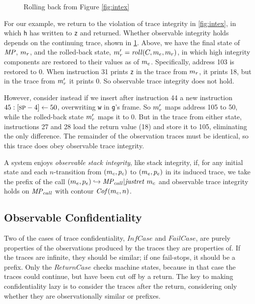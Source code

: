 \documentclass[acmsmall,review,anonymous]{acmart}\settopmatter{printfolios=true,printccs=false,printacmref=false}
\begin{document}
    \begin{figure}
      \integritylazyexample
      \caption{Rolling back from Figure \ref{fig:intex}}
      \label{fig:intlex}
    \end{figure}

    For our example, we return to the violation of trace integrity in
    \cref{fig:intex}, in which {\tt h} has written to {\tt z} and returned.
    Whether observable integrity holds depends on the continuing trace, shown
    in \cref{fig:intlex}. Above, we have the final state of \(\mathit{MP}\),
    \(m_r\), and the rolled-back state, \(m_r' =
    \mathit{roll}(C,m_e,m_r)\), in which high integrity
    components are restored to their values as of \(m_e\). Specifically,
    address 103 is restored to 0. When instruction 31 prints {\tt z} in the
    trace from \(m_r\), it prints 18, but in the trace from \(m_r'\)
    it prints 0. So observable trace integrity does not hold.

    However, consider instead if we insert after instruction 44 a new
    instruction \(45: [\textsc{sp}-4] \leftarrow 50\), overwriting {\tt w} in
    {\tt g}'s frame. So \(m_r'\) maps address 105 to 50, while the
    rolled-back state \(m_r'\) maps it to 0. But in the trace from either
    state, instructions 27 and 28 load the return value (18) and store it to
    105, eliminating the only difference. The remainder of the observation
    traces must be identical, so this trace does obey observable trace
    integrity.


      A system enjoys {\em observable stack integrity}, like stack integrity,
      if, for any initial state and each \(n\)-transition from
      \((m_c,p_c)\) to \((m_e,p_e)\) in its
      induced trace, we take the prefix of the call
      \((m_e,p_e) \hookrightarrow \mathit{MP}_{call} | \mathit{justret}\ m_c\)
      and observable trace integrity holds on \(\mathit{MP}_{call}\) with
      contour \(\mathit{Cof}(m_c,n)\).

  \subsection{Observable Confidentiality}

      Two of the cases of trace confidentiality, \(\mathit{InfCase}\) and
      \(\mathit{FailCase}\), are purely properties of the observations produced
      by the traces they are properties of. If the traces are infinite, they
      should be similar; if one fail-stops, it should be a prefix. Only
      the \(\mathit{ReturnCase}\) checks machine states, because in that case
      the traces could continue, but have been cut off by a return. The key
      to making confidentiality lazy is to consider the traces after the
      return, considering only whether they are observationally similar
      or prefixes.
\end{document}
